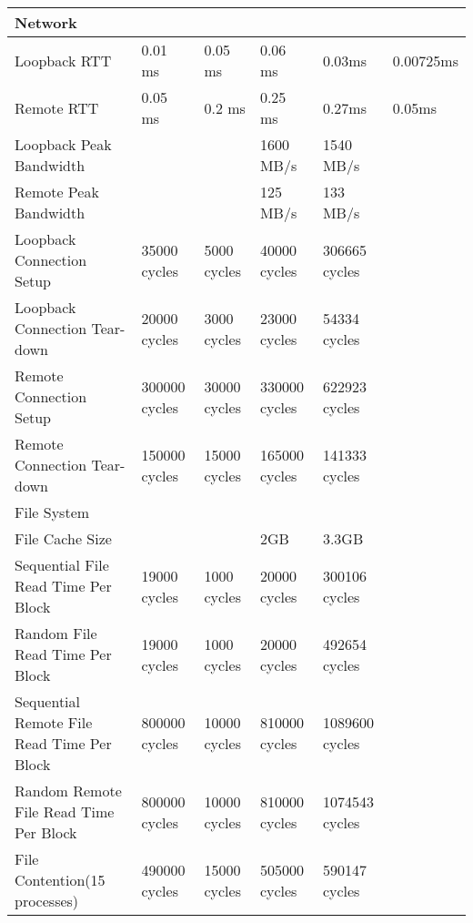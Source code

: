 \small
\begin{center}
\begin{tabular}{| p{4cm} | p{2cm} | p{2cm} | p{2cm} | p{2.5cm} | p{2cm}} 

\hline 
Network & & & & & \\
\hline
Loopback RTT & 0.01 ms & 0.05 ms& 0.06 ms & 0.03ms & 0.00725ms \\
Remote RTT & 0.05 ms& 0.2 ms & 0.25 ms & 0.27ms & 0.05ms\\
Loopback Peak Bandwidth & & & 1600 MB/s & 1540 MB/s \\
Remote Peak Bandwidth & & &  125 MB/s  & 133 MB/s\\
Loopback Connection Setup & 35000 cycles& 5000 cycles& 40000 cycles& 306665 cycles \\
Loopback Connection Tear-down & 20000 cycles& 3000 cycles& 23000 cycles& 54334 cycles \\
Remote Connection Setup & 300000  cycles& 30000 cycles& 330000 cycles& 622923 cycles\\
Remote Connection Tear-down & 150000  cycles& 15000 cycles& 165000 cycles& 141333 cycles\\

\hline 
File System& & & & \\
\hline
File Cache Size & & & 2GB & 3.3GB \\ 
Sequential File Read Time Per Block& 19000 cycles & 1000 cycles& 20000 cycles& 300106 cycles\\
Random File Read Time Per Block& 19000 cycles& 1000 cycles& 20000 cycles& 492654 cycles \\
Sequential Remote File Read Time Per Block& 800000 cycles& 10000 cycles& 810000 cycles& 1089600 cycles\\
Random Remote File Read Time Per Block& 800000 cycles& 10000 cycles& 810000 cycles& 1074543 cycles\\
File Contention(15 processes) & 490000 cycles& 15000 cycles& 505000 cycles& 590147 cycles\\

\end{tabular}
\end{center}